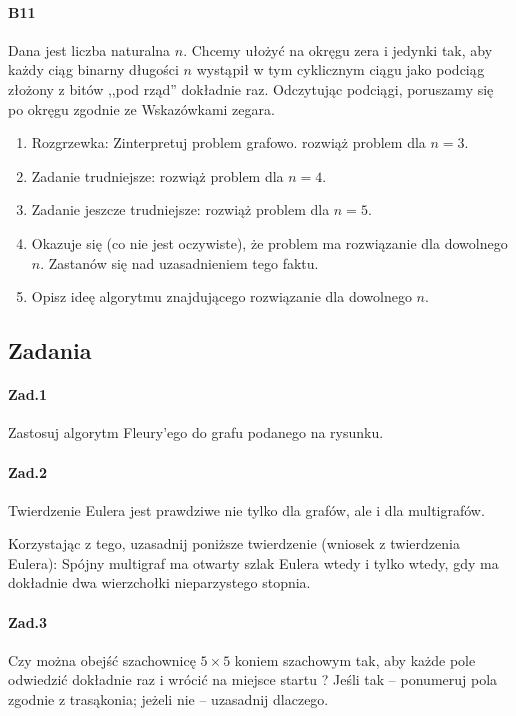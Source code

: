 \paragraph{B11} Dana jest liczba naturalna $n$. Chcemy ułożyć na okręgu zera i jedynki tak, aby każdy ciąg binarny
długości $n$ wystąpił w tym cyklicznym ciągu jako podciąg złożony z bitów ,,pod rząd” dokładnie raz. Odczytując podciągi, poruszamy się po okręgu zgodnie ze Wskazówkami zegara.
\begin{enumerate}[label=\alph*)]
\item Rozgrzewka: Zinterpretuj problem grafowo. rozwiąż problem dla $n = 3$.
\item Zadanie trudniejsze: rozwiąż problem dla $n = 4$.
\item Zadanie jeszcze trudniejsze: rozwiąż problem dla $n = 5$.
\item Okazuje się (co nie jest oczywiste), że problem ma rozwiązanie dla dowolnego $n$. Zastanów się nad uzasadnieniem tego faktu.
\item Opisz ideę algorytmu znajdującego rozwiązanie dla dowolnego $n$.
\end{enumerate}

\subsection{Zadania}
\paragraph{Zad.1} Zastosuj algorytm Fleury’ego do grafu podanego na rysunku.

\paragraph{Zad.2} Twierdzenie Eulera jest prawdziwe nie tylko dla grafów, ale i dla multigrafów.

Korzystając z tego, uzasadnij poniższe twierdzenie (wniosek z twierdzenia Eulera):
Spójny multigraf ma otwarty szlak Eulera wtedy i tylko wtedy, gdy ma dokładnie dwa wierzchołki nieparzystego stopnia.

\paragraph{Zad.3} Czy można obejść szachownicę $5\times 5$ koniem szachowym tak, aby każde pole odwiedzić dokładnie raz i wrócić na miejsce startu ? Jeśli tak – ponumeruj pola zgodnie z trasąkonia; jeżeli nie – uzasadnij dlaczego.

